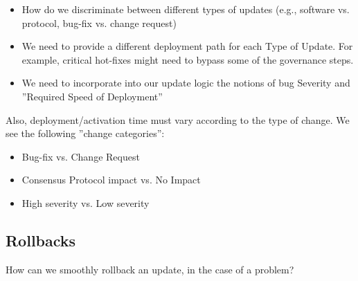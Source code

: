 \begin{itemize}
\item How do we discriminate between different types of updates (e.g., software vs. protocol, bug-fix vs. change request)
\item We need to provide a different deployment path for each Type of Update. For example, critical hot-fixes might need to bypass some of the governance steps.
\item We need to incorporate into our update logic the notions of bug Severity and ''Required Speed of Deployment''
\end{itemize}

Also, deployment/activation time must vary according to the type of change. We see the following ''change categories'':
\begin{itemize}
\item Bug-fix vs. Change Request
\item Consensus Protocol impact vs. No Impact
\item High severity vs. Low severity
\end{itemize}

\subsection*{Rollbacks}
How can we smoothly rollback an update, in the case of a problem?


